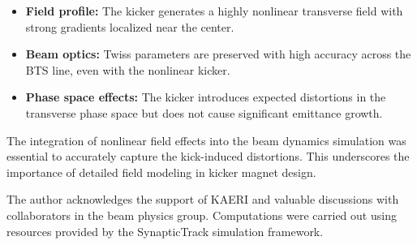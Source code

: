 \documentclass[a4paper,11pt]{article}
\begin{document}
\begin{itemize}
    \item \textbf{Field profile:} The kicker generates a highly nonlinear transverse field with strong gradients localized near the center.
    \item \textbf{Beam optics:} Twiss parameters are preserved with high accuracy across the BTS line, even with the nonlinear kicker.
    \item \textbf{Phase space effects:} The kicker introduces expected distortions in the transverse phase space but does not cause significant emittance growth.
\end{itemize}

The integration of nonlinear field effects into the beam dynamics simulation was essential to accurately capture the kick-induced distortions. This underscores the importance of detailed field modeling in kicker magnet design.

\acknowledgments

The author acknowledges the support of KAERI and valuable discussions with collaborators in the beam physics group. Computations were carried out using resources provided by the SynapticTrack simulation framework.



\end{document}
